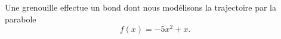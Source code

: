
\begin{exercice}\label{exosmath-0400}

    Une grenouille effectue un bond dont nous modélisons la trajectoire par la parabole
    \begin{equation}
        f(x)=-5x^2+x.
    \end{equation}
    

\end{exercice}
